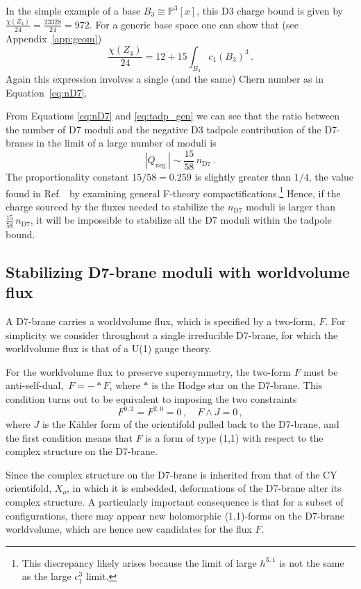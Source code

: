 \documentclass[a4paper,12pt]{article}
\numberwithin{equation}{section}
\newcommand{\kahl}{K\"ahler}
\newcommand{\w}{\ensuremath{\wedge}}
\newcommand{\mbb}{\mathbb}
\newcommand{\be}{\begin{equation}}
\newcommand{\ee}{\end{equation}}
\newcommand{\fthb}{B_3}				%
\newcommand{\cyo}{X_o}				%
\newcommand{\ec}{\chi}				%
\begin{document}
In the simple example of a base $\fthb \cong \mbb{P}^3[x]$, this D3 charge bound is given by $\frac{\ec(Z_4)}{24} = \frac{23328}{24} = 972$. For a generic base space one can show that (see Appendix~\ref{app:geom})
\be
\frac{\ec(Z_4)}{24} = 12 + 15\int_{\fthb}c_1(\fthb)^3  \,.
\label{eq:tadp_gen}
\ee
Again this expression involves a single (and the same) Chern number as in Equation~\eqref{eq:nD7}.

From Equations \eqref{eq:nD7} and \eqref{eq:tadp_gen} we can see that the ratio between the number of D7 moduli and the negative D3 tadpole contribution of the D7-branes in the limit of a large number of moduli is
\be \label{tadpolenD7}
|Q_\mathrm{neg.}| \sim \frac{15}{58} \, n_{\mathrm{D}7} \ .
\ee
The proportionality constant $15/58=0.259$ is slightly greater than $1/4$, the value found in Ref.~\cite{Bena:2020xrh} by examining general F-theory compactifications.\footnote{This discrepancy likely arises because the limit of large $h^{3,1}$  \cite{Bena:2020xrh} is not the same as the large $c_1^3$ limit.}
Hence, if the charge sourced by the fluxes needed to stabilize the $n_{\mathrm{D}7}$ moduli is larger than $\frac{15}{58}\,n_{\mathrm{D}7}$, it will be impossible to stabilize all the D7 moduli within the tadpole bound.


\subsection{Stabilizing D7-brane moduli with worldvolume flux}
\label{sec:setup_stab}

A D7-brane carries a worldvolume flux, which is specified by a two-form, $F$. For simplicity we consider throughout a single irreducible D7-brane, for which the worldvolume flux is that of a U(1) gauge theory.

\bigskip

For the worldvolume flux to preserve supersymmetry, the two-form $F$ must be anti-self-dual,\ $F = -*F$, where $*$ is the Hodge star on the D7-brane. This condition turns out to be equivalent to imposing the two constraints \cite{Marino:1999af}
\be
F^{0,2} = F^{2,0} = 0 \,, \quad F \w J = 0 \,,
\label{eq:sups_conds}
\ee
where $J$ is the {\kahl} form of the orientifold pulled back to the D7-brane, and the first condition means that $F$ is a form of type (1,1) with respect to the complex structure on the D7-brane.

Since the complex structure on the D7-brane is inherited from that of the CY orientifold, $\cyo$, in which it is embedded, deformations of the D7-brane alter its complex structure. A particularly important consequence is that for a subset of configurations, there may appear new holomorphic (1,1)-forms on the D7-brane worldvolume, which are hence new candidates for the flux $F$.
\end{document}
